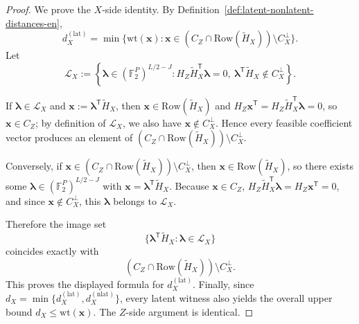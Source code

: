 \documentclass[10pt,a4paper]{amsart}
\newcommand{\Ftwo}{\mathbb{F}_2}
\newcommand{\Htil}{\tilde{H}}
\newcommand{\Row}{\mathrm{Row}}
\newcommand{\vect}[1]{\bm{#1}}
\newcommand{\vlambda}{\vect{\lambda}}
\newcommand{\vx}{\vect{x}}
\newcommand{\wt}{\mathrm{wt}}
\begin{document}
\begin{proof}
We prove the $X$-side identity. By Definition~\ref{def:latent-nonlatent-distances-en},
\[
d_X^{(\mathrm{lat})}
=
\min\{\wt(\vx):\vx\in (C_Z\cap \Row(\Htil_X))\setminus C_X^\perp\}.
\]
Let
\[
\mathcal{L}_X
:=
\left\{
\vlambda\in(\Ftwo^P)^{L/2-J}:
H_Z\Htil_X^{\mathsf T}\vlambda=0,\ 
\vlambda^{\mathsf T}\Htil_X\notin C_X^\perp
\right\}.
\]

If $\vlambda\in\mathcal{L}_X$ and $\vx:=\vlambda^{\mathsf T}\Htil_X$, then
$\vx\in\Row(\Htil_X)$ and
$H_Z\vx^{\mathsf T}=H_Z\Htil_X^{\mathsf T}\vlambda=0$,
so $\vx\in C_Z$; by definition of $\mathcal{L}_X$, we also have
$\vx\notin C_X^\perp$.
Hence every feasible coefficient vector produces an element of
$(C_Z\cap \Row(\Htil_X))\setminus C_X^\perp$.

Conversely, if $\vx\in (C_Z\cap \Row(\Htil_X))\setminus C_X^\perp$,
then $\vx\in\Row(\Htil_X)$, so there exists some
$\vlambda\in(\Ftwo^P)^{L/2-J}$ with
$\vx=\vlambda^{\mathsf T}\Htil_X$.
Because $\vx\in C_Z$,
$H_Z\Htil_X^{\mathsf T}\vlambda=H_Z\vx^{\mathsf T}=0$,
and since $\vx\notin C_X^\perp$, this $\vlambda$ belongs to $\mathcal{L}_X$.

Therefore the image set
\[
\{\vlambda^{\mathsf T}\Htil_X:\vlambda\in\mathcal{L}_X\}
\]
coincides exactly with
\[
(C_Z\cap \Row(\Htil_X))\setminus C_X^\perp.
\]
This proves the displayed formula for $d_X^{(\mathrm{lat})}$.
Finally, since
$d_X=\min\{d_X^{(\mathrm{lat})},d_X^{(\mathrm{nlat})}\}$,
every latent witness also yields the overall upper bound $d_X\le \wt(\vx)$.
The $Z$-side argument is identical.
\end{proof}
\end{document}
